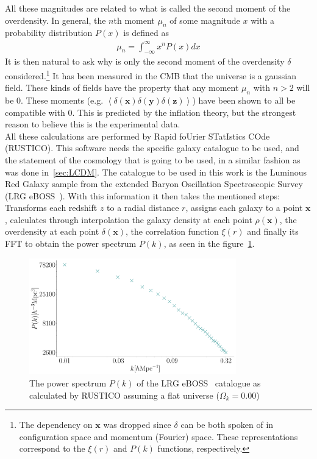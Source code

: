 All these magnitudes are related to what is called the second moment of the overdensity. In general, the $n$th moment $\mu_n$ of some magnitude $x$ with a probability distribution $P(x)$ is defined as 
\begin{align}
	\mu_n = \int_{-\infty}^{\infty} x^{n}P(x)dx 
	\label{eq:n-moment}
\end{align}
It is then natural to ask why is only the second moment of the overdensity $\delta$ considered.\footnote{The dependency on $\textbf{x}$ was dropped since $\delta$ can be both spoken of in configuration space and momentum (Fourier) space. These representations correspond to the $\xi(r)$ and $P(k)$ functions, respectively.}
It has been measured in the CMB that the universe is a gaussian field. These kinds of fields have the property that any moment $\mu_n$ with $n>2$ will be 0. These moments (e.g. $ \left<\delta(\textbf{x}) \delta(\textbf{y}) \delta(\textbf{z}) \right>$) have been shown to all be compatible with 0. This is predicted by the inflation theory, but the strongest reason to believe this is the experimental data. \\

All these calculations are performed by Rapid foUrier STatIstics COde (RUSTICO)\cite{rustico}. This software needs the specific galaxy catalogue to be used, and the statement of the cosmology that is going to be used, in a similar fashion as was done in~\ref{sec:LCDM}. The catalogue to be used in this work is the Luminous Red Galaxy sample from the extended Baryon Oscillation Spectroscopic Survey (LRG eBOSS~\cite{eBoss}).
With this information it then takes the mentioned steps: Transforms each redshift $z$ to a radial distance $r$, assigns each galaxy to a point $\textbf{x}$, calculates through interpolation the galaxy density at each point $\rho\left(  \textbf{x}\right)$, the overdensity at each point $\delta\left( \textbf{x} \right)$, the correlation function $\xi(r)$ and finally its FFT to obtain the power spectrum $P(k)$, as seen in the figure~\ref{fig:rustico}. \\


\begin{figure}[t]
	\centering
	\includegraphics[width=0.8\textwidth]{../figs/Pkrustico.pdf}
	\caption{The power spectrum $P(k)$ of the LRG eBOSS~\cite{eBoss} catalogue as calculated by RUSTICO assuming a flat universe ($\Omega_k = 0.00$)}
	\label{fig:rustico}
\end{figure}



